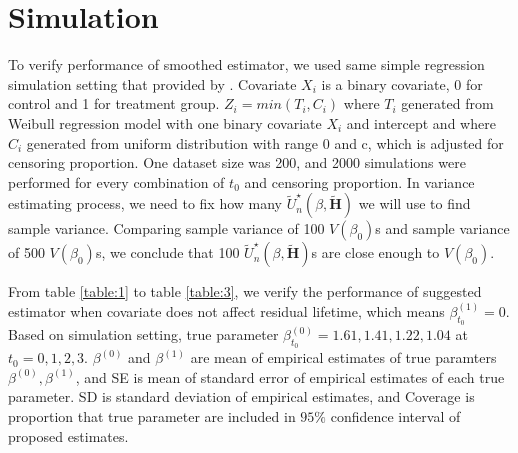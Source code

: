 \documentclass[titlepage,english,12pt]{article}
\begin{document}
\section{Simulation}

	To verify performance of smoothed estimator, we used same simple regression simulation setting that provided by \citet{jung2009regression}. Covariate $X_i$ is a binary covariate, 0 for control and 1 for treatment group. $Z_i = min(T_i, C_i)$ where $T_i$ generated from Weibull regression model with one binary covariate $X_i$ and intercept and where $C_i$ generated from uniform distribution with range 0 and c, which is adjusted for censoring proportion. One dataset size was 200, and 2000 simulations were performed for every combination of $t_0$ and censoring proportion. In variance estimating process, we need to fix how many $\tilde{U}^{\star }_n(\beta, \tilde{\textbf{H}})$ we will use to find sample variance. Comparing sample variance of 100 $V(\beta_0)$s and sample variance of 500 $V(\beta_0)$s, we conclude that 100 $\tilde{U}^{\star }_n(\beta, \tilde{\textbf{H}})$s are close enough to $V(\beta_0)$.
	
	From table \ref{table:1} to table \ref{table:3}, we verify the performance of suggested estimator when covariate does not affect residual lifetime, which means $\beta_{t_0}^{(1)} = 0$. Based on \citet{jung2009regression} simulation setting, true parameter $\beta_{t_0}^{(0)} = 1.61, 1.41, 1.22, 1.04$ at $t_0 = 0, 1, 2, 3$. $\beta^(0)$ and $\beta^(1)$ are mean of empirical estimates of true paramters $\beta^(0), \beta^(1)$, and SE is mean of standard error of empirical estimates of each true parameter. SD is standard deviation of empirical estimates, and Coverage is proportion that true parameter are included in $95\%$ confidence interval of proposed estimates. 

\end{document}
